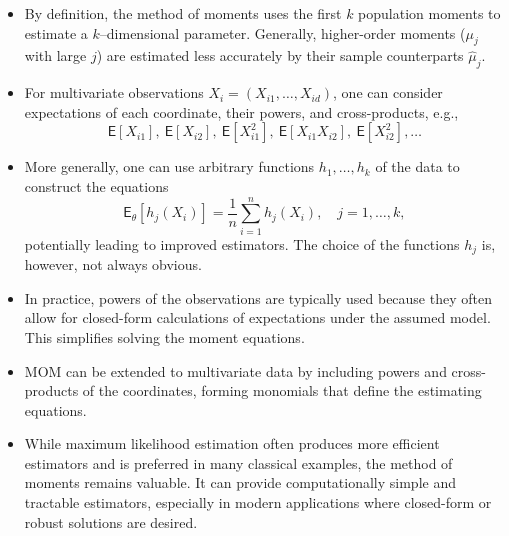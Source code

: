 %
\label{par:Comments on MOM}

\begin{itemize}
    \item By definition, the method of moments uses the first \(k\) population moments to estimate a \(k\)--dimensional parameter. Generally, higher-order moments (\(\mu_j\) with large \(j\)) are estimated less accurately by their sample counterparts \(\hat{\mu}_j\).
    
    \item For multivariate observations \(X_i = (X_{i1}, \dots, X_{id})\), one can consider expectations of each coordinate, their powers, and cross-products, e.g.,
    \[
        \mathsf{E}[X_{i1}],\ \mathsf{E}[X_{i2}],\ \mathsf{E}[X_{i1}^2],\ \mathsf{E}[X_{i1} X_{i2}],\ \mathsf{E}[X_{i2}^2], \dots
    \]
    \item More generally, one can use arbitrary functions \(h_1,\dots,h_k\) of the data to construct the equations
    \[
        \mathsf{E}_\theta[h_j(X_i)] = \frac{1}{n}\sum_{i=1}^{n} h_j(X_i), \quad j=1,\dots,k,
    \]
    potentially leading to improved estimators. The choice of the functions \(h_j\) is, however, not always obvious.
    
    \item In practice, powers of the observations are typically used because they often allow for closed-form calculations of expectations under the assumed model. This simplifies solving the moment equations.
    
    \item MOM can be extended to multivariate data by including powers and cross-products of the coordinates, forming monomials that define the estimating equations.
    
    
    \item While maximum likelihood estimation often produces more efficient estimators and is preferred in many classical examples, the method of moments remains valuable. It can provide computationally simple and tractable estimators, especially in modern applications where closed-form or robust solutions are desired.
\end{itemize}

